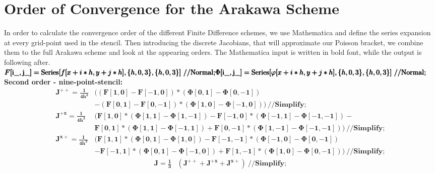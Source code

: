 

\section{Order of Convergence for the Arakawa Scheme}
\label{sec:ara_order}

In order to calculate the convergence order of the different Finite Difference schemes, we use Mathematica and define the series expansion at every grid-point used in the stencil. Then introducing the discrete Jacobians, that will approximate our Poisson bracket, we combine them to the full Arakawa scheme and look at the appearing orders. The Mathematica input is written in bold font, while the output is following after. \\ 

\noindent\(	\pmb{F[\text{i$\_$}, \text{j$\_$}] = \text{Series}[f[x+i*h,y+j*h], \{h,0, 3\}, \{h,0, 3\}] \ \text{//}\text{Normal};}\\
	\pmb{\Phi[\text{i$\_$}, \text{j$\_$}] = \text{Series}[\varphi[x+i*h,y+j*h], \{h,0, 3\}, \{h,0, 3\}] \ \text{//}\text{Normal};} \)
\textbf{Second order - nine-point-stencil:}\\
\begin{align*}
	\pmb{J^{++} = }
	\pmb{ \frac{1}{4 h^2}}
	&\pmb{( (F[1, 0] - F[-1, 0])*(\Phi[0,1]-\Phi[0,-1]) } \\
	&\pmb{- (F[0,1]-F[0,-1])*(\Phi[1,0]-\Phi[-1,0])) \ \text{//}\text{Simplify}};\\
%
	\pmb{J^{+x} = }
	\pmb{ \frac{1}{4 h^2}}
	&\pmb{( F[1,0]*(\Phi[1,1] - \Phi[1,-1])-F[-1, 0]*(\Phi[-1, 1]- \Phi[-1, -1]) - }\\
	&\pmb{F[0, 1]*(\Phi[1, 1] - \Phi[-1, 1]) + }
	\pmb{F[0, -1]*(\Phi[1, -1]-\Phi[-1,-1])) \ \text{//}\text{Simplify}}; \\
%
	\pmb{J^{x+} = }
	\pmb{ \frac{1}{4 h^2}}
	&\pmb{(F[1,1]*(\Phi[0,1]-\Phi[1,0])-F[-1,-1]*(\Phi[-1,0]-\Phi[0,-1]) }\\
	&-\pmb{F[-1,1]*(\Phi[0,1]-\Phi[-1,0])+F[1,-1]*(\Phi[1,0]-\Phi[0,-1])) \ \text{//}} \pmb{\text{Simplify}};
\end{align*}
\begin{align*}
	\pmb{ J = \frac{1}{3}} & \pmb{(J^{++} + J^{+x} + J^{x+}) \ \text{//}\text{Simplify}};
\end{align*}
